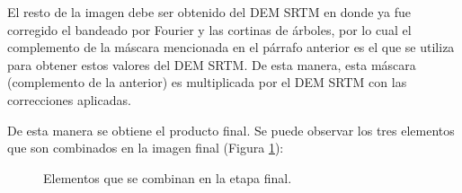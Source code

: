 \documentclass[10pt,a4paper, twoside]{report}
\begin{document}
El resto de la imagen debe ser obtenido del DEM SRTM en donde ya fue corregido el bandeado por Fourier y las cortinas de árboles, por lo cual el complemento de la máscara mencionada en el párrafo anterior es el que se utiliza para obtener estos valores del DEM SRTM. De esta manera, esta máscara (complemento de la anterior) es multiplicada por el DEM SRTM con las correcciones aplicadas.

De esta manera se obtiene el producto final. Se puede observar los tres elementos que son combinados en la imagen final (Figura \ref{elementosACombinar}):

\begin{figure}[H]
	\centering
	\caption{Elementos que se combinan en la etapa final.}
	\label{elementosACombinar}
\end{figure}
\end{document}
